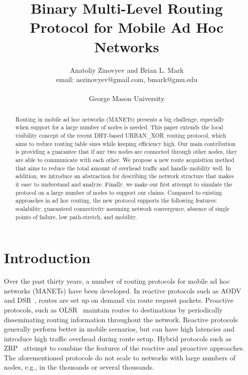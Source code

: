 \documentclass[conference]{IEEEtran}
\title{Binary Multi-Level Routing Protocol for Mobile Ad Hoc Networks}
\author{
  Anatoliy Zinovyev and Brian L. Mark \\
  email: aszinovyev@gmail.com, bmark@gmu.edu \\
   \\
  George Mason University \\
}
\theoremstyle{definition}
\newcommand{\urbanxor}{URBAN\_XOR}
\begin{document}
\maketitle

\begin{abstract}
Routing in mobile ad hoc networks (MANETs) presents a big challenge, especially when support for a large number of nodes is needed. This paper extends the local visibility concept of the recent DHT-based \urbanxor~routing protocol, which aims to reduce routing table sizes while keeping efficiency high. Our main contribution is providing a guarantee that if any two nodes are connected through other nodes, they are able to communicate with each other. We propose a new route acquisition method that aims to reduce the total amount of overhead traffic and handle mobility well. In addition, we introduce an abstraction for describing the network structure that makes it easy to understand and analyze. Finally, we make our first attempt to simulate the protocol on a large number of nodes to support our claims. Compared to existing approaches in ad hoc routing, the new protocol supports the following features:  scalability, guaranteed connectivity assuming network convergence, absence of single points of failure, low path-stretch, and mobility.
\end{abstract}



\section{Introduction}
\label{sec:introduction}

Over the past thirty years, a number of routing protocols for mobile ad hoc networks (MANETs) have been developed.
In reactive protocols such as AODV~\cite{aodv} and DSR~\cite{dsr}, routes are set up  on demand via route request packets.  Proactive protocols, such as OLSR~\cite{olsr} maintain routes to destinations by periodically disseminating routing information throughout the network. Reactive protocols generally perform better in mobile scenarios, but can have high latencies and introduce high traffic overhead during route setup.  Hybrid protocols such as ZRP~\cite{zrp} attempt to combine the features of the reactive and proactive approaches.  The aforementioned protocols do not scale to networks with large numbers of nodes, e.g., in the thousands or several thousands. 
  
\end{document}
